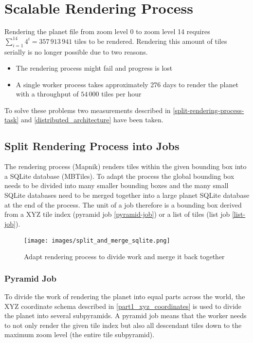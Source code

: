 \chapter{Scalable Rendering Process}\label{chapter_scalable_rendering_process}



Rendering the planet file from zoom level 0 to zoom level 14 requires $\sum_{i=1}^{14} 4^i = 357\,913\,941$ tiles to be rendered. 
Rendering this amount of tiles serially is no longer possible due to two reasons.

\begin{itemize}
    \item The rendering process might fail and progress is lost
    \item A single worker process takes approximately 276 days to render the planet with a throughput of $54\,000$ tiles per hour
\end{itemize}

To solve these problems two measurements described in \autoref{split-rendering-process-task} and \autoref{distributed_architecture} have been taken.

\section{Split Rendering Process into Jobs}\label{split-rendering-process-task}

The rendering process (Mapnik)
renders tiles within the given bounding box into a SQLite database (MBTiles). To adapt the process the global bounding box needs to be divided into many smaller bounding boxes and the many small SQLite databases need to be merged together into a large planet SQLite database at the end of the process.
The unit of a job therefore is a bounding box derived from a XYZ tile index (pyramid job \autoref{pyramid-job}) or a list of tiles (list job \autoref{list-job}).

\begin{figure}[H]
  \centering
  \texttt{[image: images/split\_and\_merge\_sqlite.png]}
  \caption{Adapt rendering process to divide work and merge it back together}
\end{figure}

\subsection{Pyramid Job}\label{pyramid-job}

To divide the work of rendering the planet into equal parts across the world, the XYZ coordinate schema described in \autoref{part1_xyz_coordinates} is used to divide the planet into several subpyramids. A pyramid job means that the worker needs to not only render the given tile index but also all descendant tiles down to the maximum zoom level (the entire tile subpyramid).

